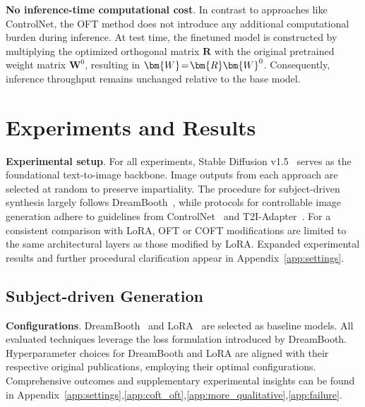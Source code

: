 {\textbf{No inference-time computational cost}. In contrast to approaches like ControlNet, the OFT method does not introduce any additional computational burden during inference. At test time, the finetuned model is constructed by multiplying the optimized orthogonal matrix $\bm{R}$ with the original pretrained weight matrix $\bm{W}^0$, resulting in $\thickmuskip=2mu \medmuskip=2mu \bm{W}=\bm{R}\bm{W}^0$. Consequently, inference throughput remains unchanged relative to the base model.

\section{Experiments and Results}

\textbf{Experimental setup}. For all experiments, Stable Diffusion v1.5~\cite{rombach2022high} serves as the foundational text-to-image backbone. Image outputs from each approach are selected at random to preserve impartiality. The procedure for subject-driven synthesis largely follows DreamBooth~\cite{ruiz2023dreambooth}, while protocols for controllable image generation adhere to guidelines from ControlNet~\cite{zhang2023adding} and T2I-Adapter~\cite{mou2023t2i}. For a consistent comparison with LoRA, OFT or COFT modifications are limited to the same architectural layers as those modified by LoRA. Expanded experimental results and further procedural clarification appear in Appendix~\ref{app:settings}.

\subsection{Subject-driven Generation}

\textbf{Configurations}. DreamBooth~\cite{ruiz2023dreambooth} and LoRA~\cite{hulora2022} are selected as baseline models. All evaluated techniques leverage the loss formulation introduced by DreamBooth. Hyperparameter choices for DreamBooth and LoRA are aligned with their respective original publications, employing their optimal configurations. Comprehensive outcomes and supplementary experimental insights can be found in Appendix~\ref{app:settings},\ref{app:coft_oft},\ref{app:more_qualitative},\ref{app:failure}.

}
